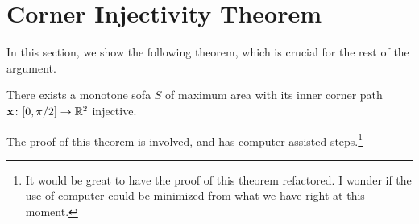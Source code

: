 \section{Corner Injectivity Theorem}

In this section, we show the following theorem, which is crucial for the rest of the argument.

\begin{theorem}
\label{thm:injective}
There exists a monotone sofa $S$ of maximum area with its inner corner path $\mathbf{x} \colon [0, \pi / 2] \rightarrow \mathbb{R}^2$ injective.
\end{theorem}

The proof of this theorem is involved, and has computer-assisted steps.\footnote{It would be great to have the proof of this theorem refactored. I wonder if the use of computer could be minimized from what we have right at this moment. }